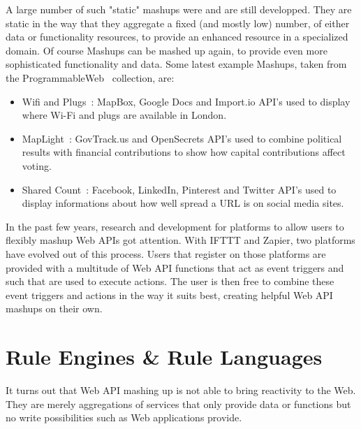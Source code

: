 A large number of such "static" mashups were and are still developped.
They are static in the way that they aggregate a fixed (and mostly low) number, of either data or functionality resources, to provide an enhanced resource in a specialized domain.
Of course Mashups can be mashed up again, to provide even more sophisticated functionality and data.
Some latest example Mashups, taken from the ProgrammableWeb~\cite{wwwProgrammableWeb} collection, are:

\begin{itemize}
  \item Wifi and Plugs~\cite{wwwWifiAndPlugs}: MapBox, Google Docs and Import.io API's used to display where Wi-Fi and plugs are available in London.
  \item MapLight~\cite{wwwMapLight}: GovTrack.us and OpenSecrets API's used to combine political results with financial contributions to show how capital contributions affect voting.
  \item Shared Count~\cite{wwwSharedCount}: Facebook, LinkedIn, Pinterest and Twitter API's used to display informations about how well spread a URL is on social media sites.
\end{itemize}

In the past few years, research and development for platforms to allow users to flexibly mashup Web APIs got attention.
With IFTTT and Zapier, two platforms have evolved out of this process.
Users that register on those platforms are provided with a multitude of Web API functions that act as event triggers and such that are used to execute actions.
The user is then free to combine these event triggers and actions in the way it suits best, creating helpful Web API mashups on their own.




\section{Rule Engines \& Rule Languages}

It turns out that Web API mashing up is not able to bring reactivity to the Web.
They are merely aggregations of services that only provide data or functions but no write possibilities such as Web applications provide.

